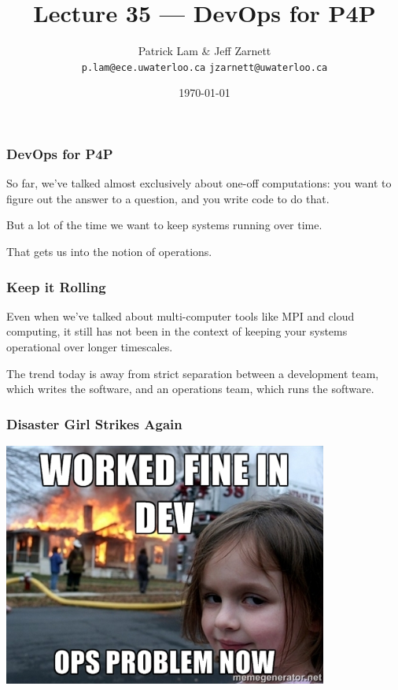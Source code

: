 

\title{Lecture 35 --- DevOps for P4P }

\author{Patrick Lam \& Jeff Zarnett \\ \small \texttt{p.lam@ece.uwaterloo.ca} \texttt{jzarnett@uwaterloo.ca}}
\date{\today}




\begin{frame}
  \titlepage

 \end{frame}



\begin{frame}
\frametitle{DevOps for P4P}

So far, we've talked almost exclusively about one-off computations:
you want to figure out the answer to a question, and you write code to
do that.

But a lot
of the time we want to keep systems running over time. 

That gets us into the notion of operations. 

\end{frame}



\begin{frame}
\frametitle{Keep it Rolling}

Even when we've talked about multi-computer tools like MPI and cloud
computing, it still has not been in the context of keeping your
systems operational over longer timescales. 

The trend today is away
from strict separation between a development team, which writes the
software, and an operations team, which runs the software.

\end{frame}



\begin{frame}
\frametitle{Disaster Girl Strikes Again}

\begin{center}
	\includegraphics[width=0.8\textwidth]{images/devops.jpg}
\end{center}

\end{frame}



